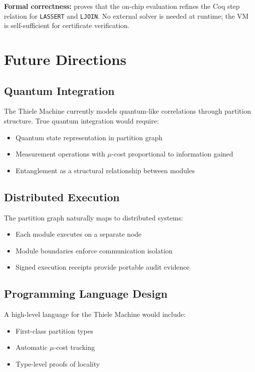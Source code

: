 \textbf{Formal correctness:}  proves that the on-chip evaluation refines the Coq step relation for \texttt{LASSERT} and \texttt{LJOIN}. No external solver is needed at runtime; the VM is self-sufficient for certificate verification.

\section{Future Directions}

\subsection{Quantum Integration}

The Thiele Machine currently models quantum-like correlations through partition structure. True quantum integration would require:
\begin{itemize}
    \item Quantum state representation in partition graph
    \item Measurement operations with $\mu$-cost proportional to information gained
    \item Entanglement as a structural relationship between modules
\end{itemize}

\subsection{Distributed Execution}

The partition graph naturally maps to distributed systems:
\begin{itemize}
    \item Each module executes on a separate node
    \item Module boundaries enforce communication isolation
    \item Signed execution receipts provide portable audit evidence
\end{itemize}

\subsection{Programming Language Design}

A high-level language for the Thiele Machine would include:
\begin{itemize}
    \item First-class partition types
    \item Automatic $\mu$-cost tracking
    \item Type-level proofs of locality
\end{itemize}

